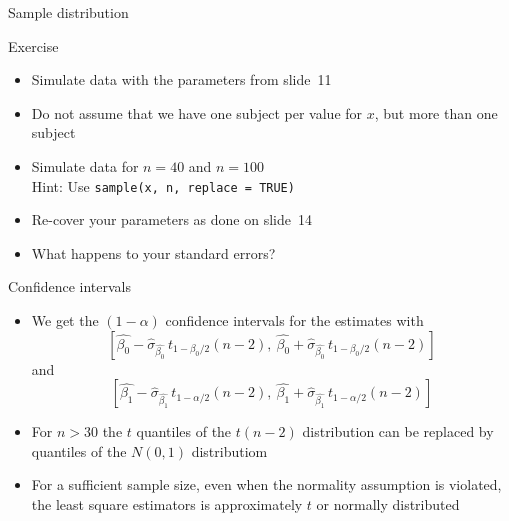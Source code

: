 \documentclass[aspectratio=169]{beamer}
\begin{document}
\begin{frame}{Sample distribution}
  \begin{center}
  \end{center}
\end{frame}

\begin{frame}{}
  \begin{block}{Exercise}
    \begin{itemize}
      \item Simulate data with the parameters from slide~11
      \item Do not assume that we have one subject per value for $x$, but
        more than one subject
      \item Simulate data for $n=40$ and $n=100$\\
        Hint: Use \texttt{sample(x, n, replace = TRUE)}
      \item Re-cover your parameters as done on slide~14
      \item What happens to your standard errors?
    \end{itemize}
  \end{block}
\end{frame}

\begin{frame}{Confidence intervals}
  \begin{itemize}
    \item We get the $(1-\alpha)$ confidence intervals for the estimates with
\[
  \left[\hat{\beta_0} - \hat{\sigma}_{\hat{\beta_0}} \, t_{1-\beta_0/2} (n-2),~
  \hat{\beta_0} + \hat{\sigma}_{\hat{\beta_0}} \, t_{1-\beta_0/2} (n-2)\right]
\]
and
\[
  \left[\hat{\beta_1} - \hat{\sigma}_{\hat{\beta_1}} \, t_{1-\alpha/2} (n-2),~
  \hat{\beta_1} + \hat{\sigma}_{\hat{\beta_1}} \, t_{1-\alpha/2} (n-2)\right]
\]
  \item For $n > 30$ the $t$ quantiles of the $t(n-2)$ distribution can be
    replaced by quantiles of the $N(0,1)$ distributiom

  \item For a sufficient sample size, even when the normality assumption is
    violated, the least square estimators is approximately $t$ or normally
      distributed
  \end{itemize}
\end{frame}
\end{document}
